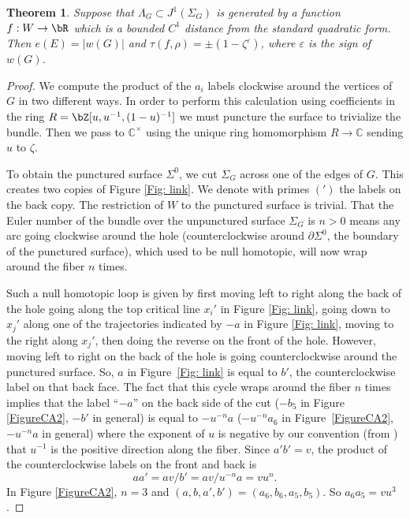\documentclass[JEP,XML,SOM,Unicode,NoFloatCountersInSection]{cedram}
\theoremstyle{plain}
\newtheorem{theorem}{Theorem}[section]
\theoremstyle{definition}
\let\ve\varepsilon
\newcommand{\bC}{\mathbb{C}}\newcommand{\bD}{\mathbb{D}}
\begin{document}
\begin{theorem}\label{thm: punching hole}
Suppose that $\Lambda_G\subset J^1(\Sigma_G)$ is generated by a function $f:W\to \bR$ which is a bounded $C^1$ distance from the standard quadratic form. Then $e(E)= |w(G)|$ and $\tau(f,\rho)=\pm(1-\zeta^\ve)$, where $\ve$ is the sign of $w(G)$.
\end{theorem}

\begin{proof} We compute the product of the $a_i$ labels clockwise around the vertices of~$G$ in two different ways. In order to perform this calculation using coefficients in the ring $R=\bZ[u,u^{-1},(1-u)^{-1}]$ we must puncture the surface to trivialize the bundle. Then we pass to $\bC^\times$ using the unique ring homomorphism $R\to \bC$ sending $u$ to $\zeta$.

To obtain the punctured surface $\Sigma^0$, we cut $\Sigma_G$ across one of the edges of $G$. This creates two copies of Figure \ref{Fig: link}. We denote with primes $(')$ the labels on the back copy. The restriction of $W$ to the punctured surface is trivial. That the Euler number of the bundle over the unpunctured surface $\Sigma_G$ is $n>0$ means any arc going clockwise around the hole (counterclockwise around $\partial\Sigma^0$, the boundary of the punctured surface), which used to be null homotopic, will now wrap around the fiber $n$ times.

Such a null homotopic loop is given by first moving left to right along the back of the hole going along the top critical line $x_i'$ in Figure \ref{Fig: link}, going down to $x_j'$ along one of the trajectories indicated by $-a$ in Figure \ref{Fig: link}, moving to the right along $x_j'$, then doing the reverse on the front of the hole. However, moving left to right on the back of the hole is going counterclockwise around the punctured surface. So, $a$ in Figure~\ref{Fig: link} is equal to $b'$, the counterclockwise label on that back face. The fact that this cycle wraps around the fiber $n$ times implies that the label ``$-a$'' on the back side of the cut ($-b_5$ in Figure \ref{FigureCA2}, $-b'$ in general) is equal to $-u^{-n}a$ ($-u^{-n}a_6$ in Figure~\ref{FigureCA2}, $-u^{-n}a$ in general) where the exponent of $u$ is negative by our convention (from \cite{IK93}) that $u^{-1}$ is the positive direction along the fiber. Since $a'b'=v$, the product of the counterclockwise labels on the front and back is
\[
aa'=av/b'=av/u^{-n}a=vu^n.
\]
In Figure \ref{FigureCA2}, $n=3$ and $(a,b,a',b')=(a_6,b_6,a_5,b_5)$. So $a_6a_5=vu^3$.


\end{proof}
\end{document}

